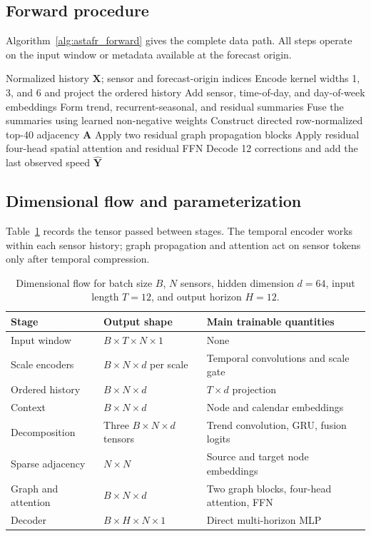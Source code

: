 \documentclass[fleqn,10pt]{wlscirep}
\newenvironment{changedcontent}{\color{changeblue}}{}
\begin{document}
\begin{changedcontent}
\subsection{Forward procedure}
Algorithm~\ref{alg:astafr_forward} gives the complete data path. All steps
operate on the input window or metadata available at the forecast origin.
\begin{algorithm}[H]
\caption{ASTAF-R deterministic forward pass}
\label{alg:astafr_forward}
\begin{algorithmic}[1]
\Require Normalized history $\mathbf{X}$; sensor and forecast-origin indices
\State Encode kernel widths 1, 3, and 6 and project the ordered history
\State Add sensor, time-of-day, and day-of-week embeddings
\State Form trend, recurrent-seasonal, and residual summaries
\State Fuse the summaries using learned non-negative weights
\State Construct directed row-normalized top-40 adjacency $\mathbf{A}$
\State Apply two residual graph propagation blocks
\State Apply residual four-head spatial attention and residual FFN
\State Decode 12 corrections and add the last observed speed
\State \Return $\widehat{\mathbf{Y}}$
\end{algorithmic}
\end{algorithm}

\subsection{Dimensional flow and parameterization}
Table~\ref{tab:dimension_flow} records the tensor passed between stages. The
temporal encoder works within each sensor history; graph propagation and
attention act on sensor tokens only after temporal compression.
\begin{table}[t]
\centering
\caption{Dimensional flow for batch size $B$, $N$ sensors, hidden dimension
$d=64$, input length $T=12$, and output horizon $H=12$.}
\label{tab:dimension_flow}
\small
\begin{tabular}{lll}
\toprule
Stage & Output shape & Main trainable quantities\\
\midrule
Input window & $B\times T\times N\times1$ & None\\
Scale encoders & $B\times N\times d$ per scale & Temporal convolutions and scale gate\\
Ordered history & $B\times N\times d$ & $T\times d$ projection\\
Context & $B\times N\times d$ & Node and calendar embeddings\\
Decomposition & Three $B\times N\times d$ tensors & Trend convolution, GRU, fusion logits\\
Sparse adjacency & $N\times N$ & Source and target node embeddings\\
Graph and attention & $B\times N\times d$ & Two graph blocks, four-head attention, FFN\\
Decoder & $B\times H\times N\times1$ & Direct multi-horizon MLP\\
\bottomrule
\end{tabular}
\end{table}


\end{changedcontent}
\end{document}
